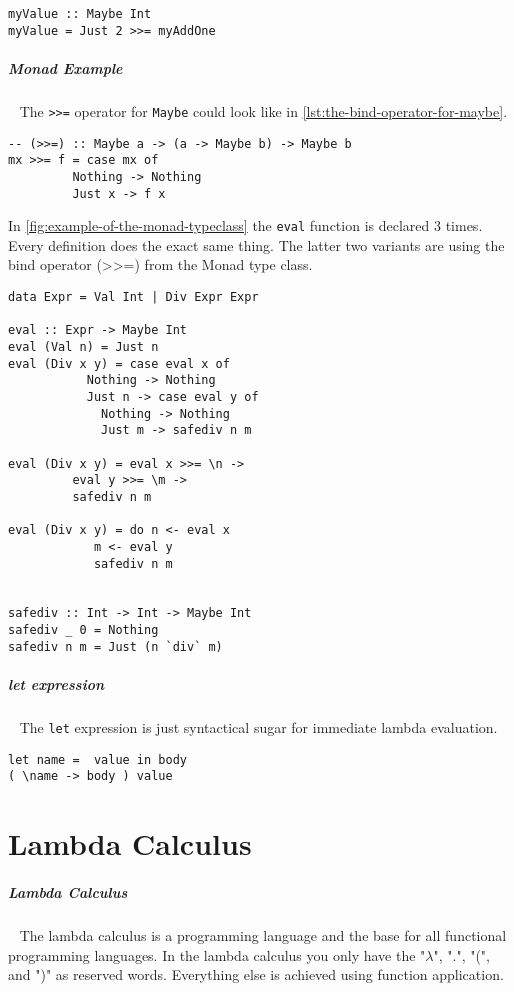 \documentclass[11pt,twoside,landscape]{article}
\begin{document}
\begin{multicols}{3}
\begin{lstlisting}
myValue :: Maybe Int
myValue = Just 2 >>= myAddOne
\end{lstlisting}

\subparagraph{Monad Example} \
\label{sec:orgf84c560}
The \texttt{>>=} operator for \texttt{Maybe} could look like in \ref{lst:the-bind-operator-for-maybe}.

\begin{lstlisting}
-- (>>=) :: Maybe a -> (a -> Maybe b) -> Maybe b
mx >>= f = case mx of
	     Nothing -> Nothing
	     Just x -> f x
\end{lstlisting}

In \ref{fig:example-of-the-monad-typeclass} the \texttt{eval} function is declared 3 times.
Every definition does the exact same thing.
The latter two variants are using the bind operator (>>=) from the Monad type class.

\begin{lstlisting}
data Expr = Val Int | Div Expr Expr

eval :: Expr -> Maybe Int
eval (Val n) = Just n
eval (Div x y) = case eval x of
		   Nothing -> Nothing
		   Just n -> case eval y of
		     Nothing -> Nothing
		     Just m -> safediv n m

eval (Div x y) = eval x >>= \n ->
		 eval y >>= \m ->
		 safediv n m 

eval (Div x y) = do n <- eval x
		    m <- eval y
		    safediv n m


safediv :: Int -> Int -> Maybe Int
safediv _ 0 = Nothing
safediv n m = Just (n `div` m)
\end{lstlisting}

\subparagraph{let expression} \
\label{sec:org5a5a97e}
The \texttt{let} expression is just syntactical sugar for immediate lambda evaluation.
\lstset{language=haskell,label= ,caption= ,captionpos=b,numbers=none}
\begin{lstlisting}
let name =  value in body
( \name -> body ) value
\end{lstlisting}

\section{Lambda Calculus}
\label{sec:orga9ba72c}
\subparagraph{Lambda Calculus} \
\label{sec:org4fc2f83}
The lambda calculus is a programming language and the base for all functional programming languages.
In the lambda calculus you only have the "\(\lambda\)", ".", "(", and ")" as reserved words.
Everything else is achieved using function application.


\end{multicols}
\end{document}
